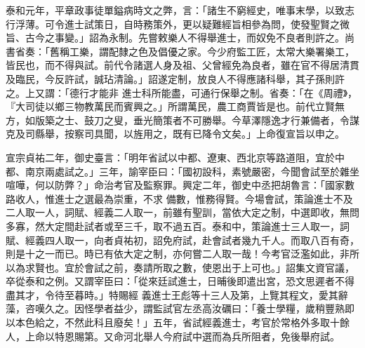 \begin{pinyinscope}
 泰和元年，平章政事徒單鎰病時文之弊，言：「諸生不窮經史，唯事末學，以致志行浮薄。可令進士試策日，自時務策外，更以疑難經旨相參為問，使發聖賢之微旨、古今之事變。」詔為永制。先嘗敕樂人不得舉進士，而奴免不良者則許之。尚書省奏：「舊稱工樂，謂配隸之色及倡優之家。今少府監工匠，太常大樂署樂工，皆民也，而不得與試。前代令諸選人身及祖、父曾經免為良者，雖在官不得居清貫及臨民，今反許試，誠玷清論。」詔遂定制，放良人不得應諸科舉，其子孫則許之。上又謂：「德行才能非
 進士科所能盡，可通行保舉之制。省奏：「在《周禮》，『大司徒以鄉三物教萬民而賓興之。」所謂萬民，農工商賈皆是也。前代立賢無方，如版築之士、鼓刀之叟，垂光簡策者不可勝舉。今草澤隱逸才行兼備者，令謀克及司縣舉，按察司具聞，以旌用之，既有已降令文矣。」上命復宣旨以申之。



 宣宗貞祐二年，御史臺言：「明年省試以中都、遼東、西北京等路道阻，宜於中都、南京兩處試之。」三年，諭宰臣曰：「國初設科，素號嚴密，今聞會試至於雜坐喧嘩，何以防弊？」命治考官及監察罪。興定二年，御史中丞把胡魯言：「國家數路收人，惟進士之選最為崇重，不求
 備數，惟務得賢。今場會試，策論進士不及二人取一人，詞賦、經義二人取一，前雖有聖訓，當依大定之制，中選即收，無問多寡，然大定間赴試者或至三千，取不過五百。泰和中，策論進士三人取一，詞賦、經義四人取一，向者貞祐初，詔免府試，赴會試者幾九千人。而取八百有奇，則是十之一而已。時已有依大定之制，亦何嘗二人取一哉！今考官泛濫如此，非所以為求賢也。宜於會試之前，奏請所取之數，使恩出于上可也。」詔集文資官議，卒從泰和之例。又謂宰臣曰：「從來廷試進士，日晡後即遣出宮，恐文思遲者不得盡其才，令待至暮時。」特賜經
 義進士王彪等十三人及第，上覽其程文，愛其辭藻，咨嘆久之。因怪學者益少，謂監試官左丞高汝礪曰：「養士學糧，歲稍豐熟即以本色給之，不然此科且廢矣！」五年，省試經義進士，考官於常格外多取十餘人，上命以特恩賜第。又命河北舉人今府試中選而為兵所阻者，免後舉府試。




\end{pinyinscope}
